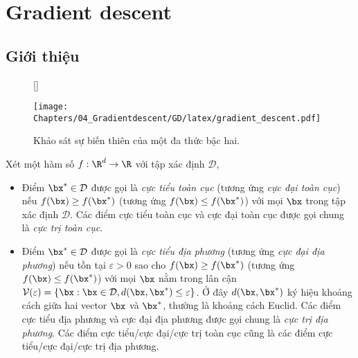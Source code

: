 \chapter{Gradient descent}
\label{cha:gradient_descent}

\section{Giới thiệu}

\begin{figure}[t]
[\FBwidth]
{\caption{
Khảo sát sự biến thiên của một đa thức bậc hai.
}
\label{fig:7_0}}
{ %
\texttt{[image: Chapters/04\_Gradientdescent/GD/latex/gradient\_descent.pdf]}
}
\end{figure}


\def\mcd{\mathcal{D}}
\def\mcv{\mathcal{V}}
Xét một hàm số $f: \R^d \rightarrow \R$ với tập xác định $\mcd$,
\begin{itemize}
\item Điểm $\bx^* \in \mcd$ được gọi là \textit{cực tiểu toàn cục} (tương ứng \textit{cực đại toàn cục}) nếu $f(\bx) \geq f(\bx^*)$ (tương ứng $f(\bx) \leq f(\bx^*)$) với mọi $\bx$ trong tập xác định $\mcd$. Các điểm cực tiểu toàn cục và cực đại toàn cục được gọi chung là \textit{cực trị toàn cục}.


\item Điểm $\bx^* \in \mcd$ được gọi là \textit{cực tiểu địa phương} (tương ứng \textit{cực đại địa phương}) nếu tồn tại $\varepsilon > 0$ sao cho $f(\bx) \geq f(\bx^*)$ (tương ứng $f(\bx) \leq f(\bx^*)$) với mọi $\bx$ nằm trong lân cận $\mcv(\varepsilon) = \{\bx: \bx \in \mcd, d(\bx, \bx^*) \leq \varepsilon\}$. Ở đây $d(\bx, \bx^*)$ ký hiệu khoảng cách giữa hai vector $\bx$ và $\bx^*$, thường là khoảng cách Euclid. Các điểm cực tiểu địa phương và cực đại địa phương được gọi chung là \textit{cực trị địa phương}. Các điểm cực tiểu/cực đại/cực trị toàn cục cũng là các điểm cực tiểu/cực đại/cực trị địa phương.
\end{itemize}




